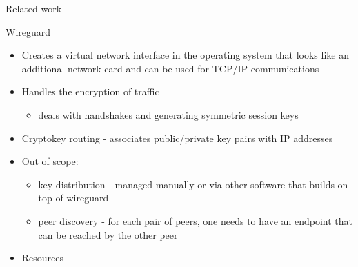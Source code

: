 \begin{frame}[fragile]{Related work}
\begin{block}{Wireguard}
\begin{itemize}
\begin{itemize}
\begin{Shaded}
\begin{Highlighting}[]
\KeywordTok{[}\KeywordTok{]}
 \OperatorTok{=} \ErrorTok{/}
 \OperatorTok{=} 
 \OperatorTok{=} \OperatorTok{=}

\KeywordTok{[}\KeywordTok{]}
 \OperatorTok{=} \ErrorTok{+}\ErrorTok{+}\ErrorTok{/}\ErrorTok{+}\OperatorTok{=}
 \OperatorTok{=} \ErrorTok{/}
 \OperatorTok{=} \ErrorTok{:}
 \OperatorTok{=} 
\end{Highlighting}
\end{Shaded}
  \end{itemize}
\item
  Creates a virtual network interface in the operating system that looks
  like an additional network card and can be used for TCP/IP
  communications
\item
  Handles the encryption of traffic

  \begin{itemize}
  \tightlist
  \item
    deals with handshakes and generating symmetric session keys
  \end{itemize}
\item
  Cryptokey routing - associates public/private key pairs with IP
  addresses
\item
  Out of scope:

  \begin{itemize}
  \tightlist
  \item
    key distribution - managed manually or via other software that
    builds on top of wireguard
  \item
    peer discovery - for each pair of peers, one needs to have an
    endpoint that can be reached by the other peer
  \end{itemize}
\item
  Resources


\end{itemize}
\end{block}
\end{frame}

